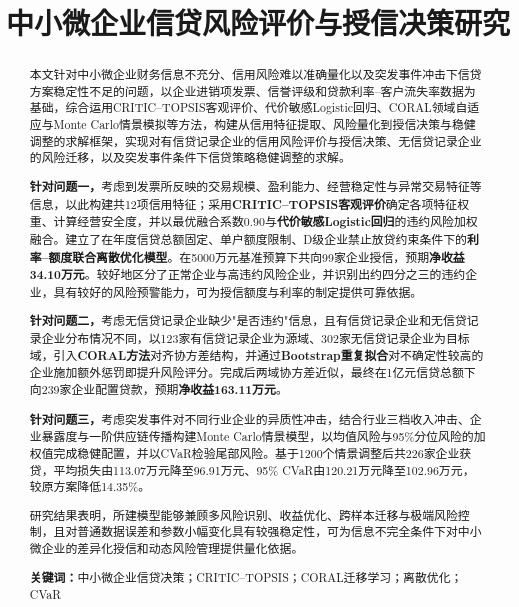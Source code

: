 \documentclass[UTF8,a4paper,12pt,fontset=fandol]{ctexart}
\title{\heiti\bfseries 中小微企业信贷风险评价与授信决策研究}
\author{}
\date{}
\numberwithin{equation}{section}
\begin{document}
\vspace{-5.5em}
\maketitle
\vspace{-2.2em}

\begin{abstract}
本文针对中小微企业财务信息不充分、信用风险难以准确量化以及突发事件冲击下信贷方案稳定性不足的问题，以企业进销项发票、信誉评级和贷款利率--客户流失率数据为基础，综合运用CRITIC--TOPSIS客观评价、代价敏感Logistic回归、CORAL领域自适应与Monte Carlo情景模拟等方法，构建从信用特征提取、风险量化到授信决策与稳健调整的求解框架，实现对有信贷记录企业的信用风险评价与授信决策、无信贷记录企业的风险迁移，以及突发事件条件下信贷策略稳健调整的求解。

\textbf{针对问题一，}考虑到发票所反映的交易规模、盈利能力、经营稳定性与异常交易特征等信息，以此构建共12项信用特征；采用\textbf{CRITIC--TOPSIS客观评价}确定各项特征权重、计算经营安全度，并以最优融合系数0.90与\textbf{代价敏感Logistic回归}的违约风险加权融合。建立了在年度信贷总额固定、单户额度限制、D级企业禁止放贷约束条件下的\textbf{利率--额度联合离散优化模型}。在5000万元基准预算下共向99家企业授信，预期\textbf{净收益34.10万元}。较好地区分了正常企业与高违约风险企业，并识别出约四分之三的违约企业，具有较好的风险预警能力，可为授信额度与利率的制定提供可靠依据。

\textbf{针对问题二，}考虑无信贷记录企业缺少"是否违约"信息，且有信贷记录企业和无信贷记录企业分布情况不同，以123家有信贷记录企业为源域、302家无信贷记录企业为目标域，引入\textbf{CORAL方法}对齐协方差结构，并通过\textbf{Bootstrap重复拟合}对不确定性较高的企业施加额外惩罚即提升风险评分。完成后两域协方差近似，最终在1亿元信贷总额下向239家企业配置贷款，预期\textbf{净收益163.11万元}。

\textbf{针对问题三，}考虑突发事件对不同行业企业的异质性冲击，结合行业三档收入冲击、企业暴露度与一阶供应链传播构建Monte Carlo情景模型，以均值风险与95\%分位风险的加权值完成稳健配置，并以CVaR检验尾部风险。基于1200个情景调整后共226家企业获贷，平均损失由113.07万元降至96.91万元、95\% CVaR由120.21万元降至102.96万元，较原方案降低14.35\%。

研究结果表明，所建模型能够兼顾多风险识别、收益优化、跨样本迁移与极端风险控制，且对普通数据误差和参数小幅变化具有较强稳定性，可为信息不完全条件下对中小微企业的差异化授信和动态风险管理提供量化依据。

\textbf{关键词：}中小微企业信贷决策；CRITIC--TOPSIS；CORAL迁移学习；离散优化；CVaR
\end{abstract}
\end{document}
